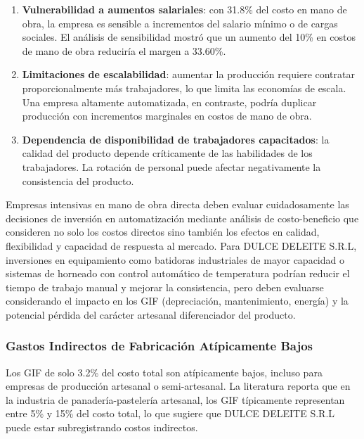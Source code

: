 \documentclass[
  stu,
  floatsintext,
  longtable,
  a4paper,
  nolmodern,
  notxfonts,
  notimes,
  12pt,
  colorlinks=true,linkcolor=blue,citecolor=blue,urlcolor=blue]{apa7}
\begin{document}
\begin{enumerate}
\def\labelenumi{\arabic{enumi}.}
\item
  \textbf{Vulnerabilidad a aumentos salariales}: con 31.8\% del costo en
  mano de obra, la empresa es sensible a incrementos del salario mínimo
  o de cargas sociales. El análisis de sensibilidad mostró que un
  aumento del 10\% en costos de mano de obra reduciría el margen a
  33.60\%.
\item
  \textbf{Limitaciones de escalabilidad}: aumentar la producción
  requiere contratar proporcionalmente más trabajadores, lo que limita
  las economías de escala. Una empresa altamente automatizada, en
  contraste, podría duplicar producción con incrementos marginales en
  costos de mano de obra.
\item
  \textbf{Dependencia de disponibilidad de trabajadores capacitados}: la
  calidad del producto depende críticamente de las habilidades de los
  trabajadores. La rotación de personal puede afectar negativamente la
  consistencia del producto.
\end{enumerate}

Empresas intensivas en mano de obra directa deben evaluar cuidadosamente
las decisiones de inversión en automatización mediante análisis de
costo-beneficio que consideren no solo los costos directos sino también
los efectos en calidad, flexibilidad y capacidad de respuesta al
mercado. Para DULCE DELEITE S.R.L, inversiones en equipamiento como
batidoras industriales de mayor capacidad o sistemas de horneado con
control automático de temperatura podrían reducir el tiempo de trabajo
manual y mejorar la consistencia, pero deben evaluarse considerando el
impacto en los GIF (depreciación, mantenimiento, energía) y la potencial
pérdida del carácter artesanal diferenciador del producto.

\subsubsection{Gastos Indirectos de Fabricación Atípicamente
Bajos}\label{gastos-indirectos-de-fabricaciuxf3n-atuxedpicamente-bajos}

Los GIF de solo 3.2\% del costo total son atípicamente bajos, incluso
para empresas de producción artesanal o semi-artesanal. La literatura
reporta que en la industria de panadería-pastelería artesanal, los GIF
típicamente representan entre 5\% y 15\% del costo total, lo que sugiere
que DULCE DELEITE S.R.L puede estar subregistrando costos indirectos.
\end{document}
